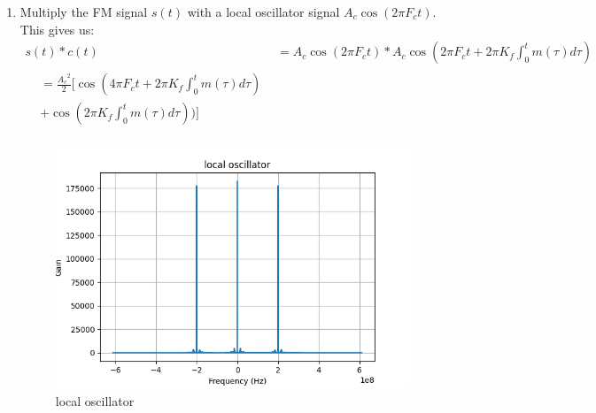\documentclass[journal,5pt,twocolumn]{IEEEtran}
\begin{document}
\begin{enumerate}
 \item    Multiply the FM signal $s(t)$ with a local oscillator signal $A_c\cos(2\pi F_ct)$. This gives us:
 \begin{align}   
    s(t)*c(t)& = A_c \cos(2 \pi F_c t )*  A_c \cos (2 \pi F_c t +2\pi K_{f} \int_{0}^t m(\tau) d\tau) \\
    \begin{split}
    &=\frac{{A_c}^2}{2}[\cos (4 \pi F_c t +2\pi K_{f} \int_{0}^t m(\tau) d\tau)\\ & + \cos (2\pi K_{f} \int_{0}^t m(\tau) d\tau))]  
    \end{split}
    \end{align}
    
    \begin{figure}
\centering 
\includegraphics[width=\columnwidth]{../figs/lo.png} 
\caption{local oscillator}
\label{fig:lo}
\end{figure}


\end{enumerate}
\end{document}
